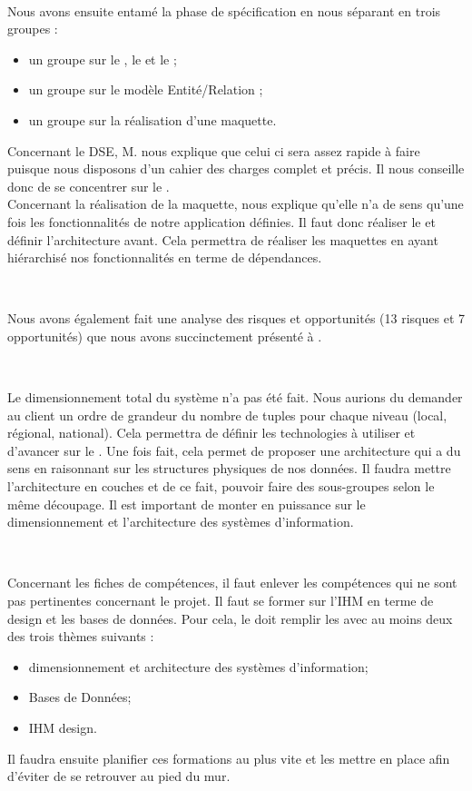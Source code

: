 \documentclass [a4paper] {article}
\begin{document}
~

Nous avons ensuite entamé la phase de spécification en nous séparant en trois groupes : 
\begin{itemize}
\item un groupe sur le \DSE{}, le \DSI{} et le \PTV{} ; 
\item un groupe sur le modèle Entité/Relation ;
\item un groupe sur la réalisation d'une maquette.
\end{itemize}

Concernant le DSE, M. \nomTuteurPedago{} nous explique que celui ci sera assez rapide à faire puisque nous disposons d'un cahier des charges complet et précis. Il nous conseille donc de se concentrer sur le \PTV{}.
\\
Concernant la réalisation de la maquette, \nomTuteurPedago{} nous explique qu'elle n'a de sens qu'une fois les fonctionnalités de notre application définies. Il faut donc réaliser le \DSICourt{} et définir l'architecture avant. Cela permettra de réaliser les maquettes en ayant hiérarchisé nos fonctionnalités en terme de dépendances.

~

Nous avons également fait une analyse des risques et opportunités (13 risques et 7 opportunités) que nous avons succinctement présenté à \nomTuteurPedago{}.

~

Le dimensionnement total du système n'a pas été fait. Nous aurions du demander au client un ordre de grandeur du nombre de tuples pour chaque niveau (local, régional, national). Cela permettra de définir les technologies à utiliser et d'avancer sur le \DSICourt{}. Une fois fait, cela permet de proposer une architecture qui a du sens en raisonnant sur les structures physiques de nos données. Il faudra mettre l'architecture en couches et de ce fait, pouvoir faire des sous-groupes selon le même découpage. Il est important de monter en puissance sur le dimensionnement et l'architecture des systèmes d'information.

~

Concernant les fiches de compétences, il faut enlever les compétences qui ne sont pas pertinentes concernant le projet. Il faut se former sur l'IHM en terme de design et les bases de données. Pour cela, le \RQCourt doit remplir les \FF{} avec au moins deux des trois thèmes suivants :
\begin{itemize}
\item dimensionnement et architecture des systèmes d'information;
\item Bases de Données;
\item IHM design.
\end{itemize}
Il faudra ensuite planifier ces formations au plus vite et les mettre en place afin d'éviter de se retrouver au pied du mur.
\end{document}
